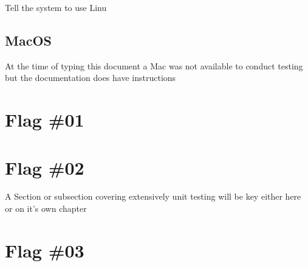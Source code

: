 Tell the system to use Linu
\clearpage
\subsection{MacOS}
At the time of typing this document a Mac was not available to conduct testing
but the documentation\cite{Docker:Mac_Install} does have instructions





\section{Flag \#01}



\section{Flag \#02}

%

A Section or subsection covering extensively unit testing will be key either here or on it's own chapter
\newpage

\section{Flag \#03}

%
\newpage


